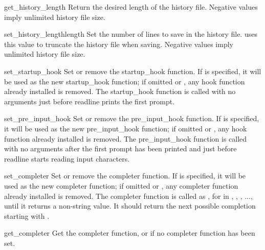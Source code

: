 \begin{funcdesc}{get_history_length}{}
Return the desired length of the history file.  Negative values imply
unlimited history file size.
\end{funcdesc}

\begin{funcdesc}{set_history_length}{length}
Set the number of lines to save in the history file.
 uses this value to truncate the
history file when saving.  Negative values imply unlimited history
file size.
\end{funcdesc}

\begin{funcdesc}{set_startup_hook}{}
Set or remove the startup_hook function.  If  is specified,
it will be used as the new startup_hook function; if omitted or
, any hook function already installed is removed.  The
startup_hook function is called with no arguments just
before readline prints the first prompt.
\end{funcdesc}

\begin{funcdesc}{set_pre_input_hook}{}
Set or remove the pre_input_hook function.  If  is specified,
it will be used as the new pre_input_hook function; if omitted or
, any hook function already installed is removed.  The
pre_input_hook function is called with no arguments after the first prompt
has been printed and just before readline starts reading input characters.
\end{funcdesc}

\begin{funcdesc}{set_completer}{}
Set or remove the completer function.  If  is specified,
it will be used as the new completer function; if omitted or
, any completer function already installed is removed.  The
completer function is called as , for  in , , , ...,
until it returns a non-string value.  It should return the next
possible completion starting with .
\end{funcdesc}

\begin{funcdesc}{get_completer}{}
Get the completer function, or  if no completer function
has been set.  
\end{funcdesc}

